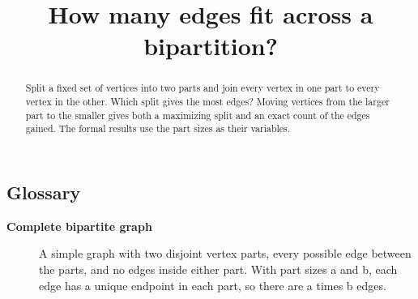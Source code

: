 \documentclass{article}
\title{How many edges fit across a bipartition?}
\author{}
\date{}
\theoremstyle{paperresult}
\begin{document}
\maketitle
\begin{abstract}
Split a fixed set of vertices into two parts and join every vertex in one part to every vertex in the other. Which split gives the most edges? Moving vertices from the larger part to the smaller gives both a maximizing split and an exact count of the edges gained. The formal results use the part sizes as their variables.
\end{abstract}

\subsection*{Glossary}
\begin{description}
\item[{\normalfont\bfseries Complete bipartite graph}] A simple graph with two disjoint vertex parts, every possible edge between the parts, and no edges inside either part. With part sizes a and b, each edge has a unique endpoint in each part, so there are a times b edges.
\end{description}
\end{document}
